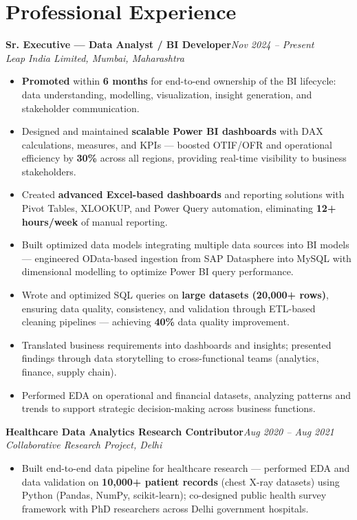 \documentclass[10pt, letterpaper]{article}
\newcommand{\role}[3]{%
  \vspace{2pt}%
  {\bfseries #1}\hfill{\small\color{muted}\textit{#3}}\\[-2pt]%
  {\small\color{muted}\textit{#2}}%
}
\begin{document}
\section{Professional Experience}

\role{Sr. Executive — Data Analyst / BI Developer}{Leap India Limited, Mumbai, Maharashtra}{Nov 2024 – Present}

\begin{itemize}
  \item \textbf{Promoted} within \textbf{6 months} for end-to-end ownership of the BI lifecycle: data understanding, modelling, visualization, insight generation, and stakeholder communication.
  \item Designed and maintained \textbf{scalable Power BI dashboards} with DAX calculations, measures, and KPIs — boosted OTIF/OFR and operational efficiency by \textbf{30\%} across all regions, providing real-time visibility to business stakeholders.
  \item Created \textbf{advanced Excel-based dashboards} and reporting solutions with Pivot Tables, XLOOKUP, and Power Query automation, eliminating \textbf{12+ hours/week} of manual reporting.
  \item Built optimized data models integrating multiple data sources into BI models — engineered OData-based ingestion from SAP Datasphere into MySQL with dimensional modelling to optimize Power BI query performance.
  \item Wrote and optimized SQL queries on \textbf{large datasets (20,000+ rows)}, ensuring data quality, consistency, and validation through ETL-based cleaning pipelines — achieving \textbf{40\%} data quality improvement.
  \item Translated business requirements into dashboards and insights; presented findings through data storytelling to cross-functional teams (analytics, finance, supply chain).
  \item Performed EDA on operational and financial datasets, analyzing patterns and trends to support strategic decision-making across business functions.
\end{itemize}

\vspace{1pt}

\role{Healthcare Data Analytics Research Contributor}{Collaborative Research Project, Delhi}{Aug 2020 – Aug 2021}

\begin{itemize}
  \item Built end-to-end data pipeline for healthcare research — performed EDA and data validation on \textbf{10,000+ patient records} (chest X-ray datasets) using Python (Pandas, NumPy, scikit-learn); co-designed public health survey framework with PhD researchers across Delhi government hospitals.
\end{itemize}
\end{document}
